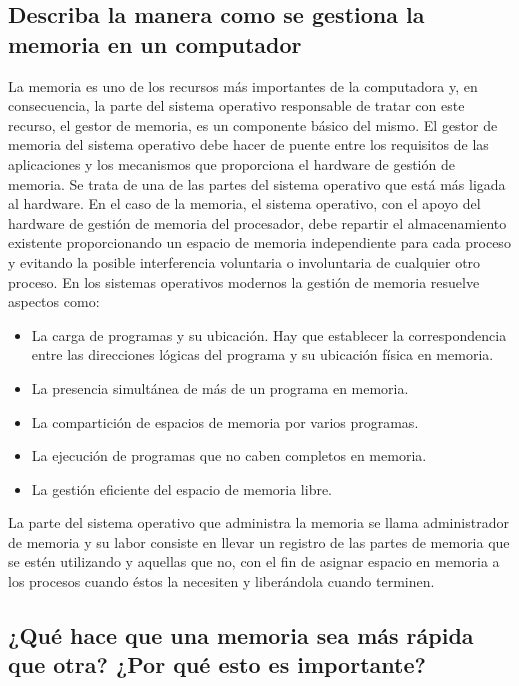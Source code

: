 \documentclass{article}
\begin{document}
\subsection{Describa la manera como se gestiona la memoria en un computador}
La memoria es uno de los recursos más importantes de la computadora y, en consecuencia, la parte del sistema operativo responsable de tratar con este recurso, el gestor de memoria, es un componente básico del mismo. El gestor de memoria del sistema operativo debe hacer de puente entre los requisitos de las aplicaciones y los mecanismos que proporciona el hardware de gestión de memoria. Se trata de una de las partes del sistema operativo que está más
ligada al hardware.
En el caso de la memoria, el sistema operativo, con el apoyo del hardware de gestión de
memoria del procesador, debe repartir el almacenamiento existente proporcionando un espacio
de memoria independiente para cada proceso y evitando la posible interferencia voluntaria o involuntaria de cualquier otro proceso.\cite{gm}\newline
 En los sistemas operativos modernos la
gestión de memoria resuelve aspectos como:
\begin{itemize}
    \item {La carga de programas y su ubicación. Hay que establecer la correspondencia
entre las direcciones lógicas del programa y su ubicación física en memoria.}
\item{ La presencia simultánea de más de un programa en memoria.}

\item{ La compartición de espacios de memoria por varios programas.}

\item{ La ejecución de programas que no caben completos en memoria.}
\item{ La gestión eficiente del espacio de memoria libre.}\cite{gestion} 
\end{itemize}
La parte del sistema operativo que administra la memoria se llama administrador de memoria y su labor consiste en llevar un registro de las partes de memoria que se estén utilizando y aquellas que no, con el fin de asignar espacio en memoria a los procesos cuando éstos la necesiten y liberándola cuando terminen.\cite{gestionm}







\subsection{¿Qué hace que una memoria sea más rápida que otra? ¿Por qué esto es importante?}










\newpage
    




\end{document}
